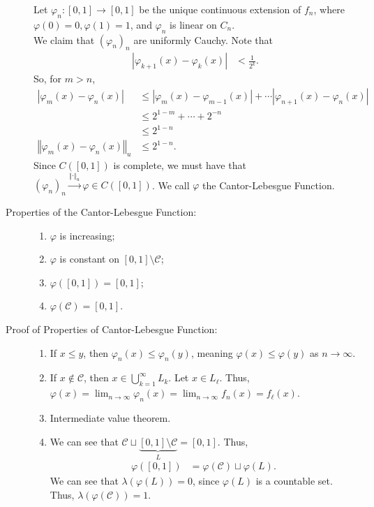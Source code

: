 \documentclass[9pt]{extarticle}
\newcommand{\norm}[1]{\left\Vert #1 \right\Vert}
\begin{document}
\begin{description}
      Let $\varphi_n: [0,1]\rightarrow [0,1]$ be the unique continuous extension of $f_n$, where $\varphi(0) = 0, \varphi(1) = 1$, and $\varphi_n$ is linear on $C_n$.\\

      We claim that $(\varphi_n)_n$ are uniformly Cauchy. Note that
      \begin{align*}
        |\varphi_{k+1}(x) -\varphi_k(x)| &< \frac{1}{2^k}.
      \end{align*}
      So, for $m > n$,
      \begin{align*}
        |\varphi_m(x) - \varphi_n(x)| &\leq |\varphi_{m}(x) - \varphi_{m-1}(x)| + \cdots | \varphi_{n+1}(x) - \varphi_n(x)|\\
                                      &\leq 2^{1-m} + \cdots + 2^{-n}\\
                                      &\leq 2^{1-n}\\
        \norm{\varphi_m(x) - \varphi_n(x)}_{u} &\leq 2^{1-n}.
      \end{align*}
      Since $C([0,1])$ is complete, we must have that $(\varphi_n)_n\xrightarrow{\norm{\cdot}_u}\varphi\in C([0,1])$. We call $\varphi$ the Cantor-Lebesgue Function.
    \item[Properties of the Cantor-Lebesgue Function:]\hfill
      \begin{enumerate}[(1)]
        \item $\varphi$ is increasing;
        \item $\varphi$ is constant on $[0,1]\setminus \mathcal{C}$;
        \item $\varphi([0,1]) = [0,1]$;
        \item $\varphi(\mathcal{C}) = [0,1]$.
      \end{enumerate}
    \item[Proof of Properties of Cantor-Lebesgue Function:]\hfill
      \begin{enumerate}[(1)]
        \item If $x\leq y$, then $\varphi_n(x) \leq \varphi_n(y)$, meaning $\varphi(x) \leq \varphi(y)$ as $n\rightarrow\infty$.
        \item If $x\notin \mathcal{C}$, then $x\in \bigcup_{k=1}^{\infty} L_k$. Let $x\in L_{\ell}$. Thus, $\varphi(x) = \lim_{n\rightarrow\infty}\varphi_n(x)=\lim_{n\rightarrow\infty}f_{n}(x) = f_{\ell}(x)$.
        \item Intermediate value theorem.
        \item We can see that $\mathcal{C}\sqcup \underbrace{[0,1]\setminus \mathcal{C}}_{L} = [0,1]$. Thus, 
          \begin{align*}
            \varphi([0,1]) &= \varphi(\mathcal{C}) \sqcup \varphi(L).
          \end{align*}
          We can see that $\lambda(\varphi(L)) = 0$, since $\varphi(L)$ is a countable set. Thus, $\lambda(\varphi(\mathcal{C})) = 1$.\\


\end{enumerate}
\end{description}
\end{document}
